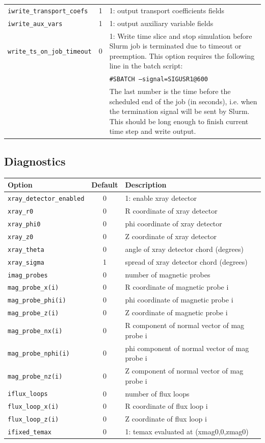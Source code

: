 \begin{tabular}{lcp{4in}}
 \texttt{iwrite\_transport\_coefs}  & 1 & 1: output transport coefficients fields \\
 \texttt{iwrite\_aux\_vars}         & 1 & 1: output auxiliary variable fields \\
 \texttt{write\_ts\_on\_job\_timeout}         & 0 & 1: Write time slice and stop simulation before Slurm job is terminated due to timeout or preemption. This option requires the following line in the batch script:\\
                         &   & \texttt{\#SBATCH --signal=SIGUSR1@600}\\
                         &   & The last number is the time before the scheduled end of the job (in seconds), i.e. when the termination signal will be sent by Slurm. This should be long enough to finish current time step and write output.\\

\end{tabular}


\subsection{Diagnostics}

\begin{tabular}{lcp{4in}}
  \textbf{Option}&\textbf{Default}&\textbf{Description}\\
  \hline
 \texttt{xray\_detector\_enabled} & 0 &  1:  enable xray detector \\
 \texttt{xray\_r0}     & 0 &  R coordinate of xray detector \\
 \texttt{xray\_phi0}   & 0 &  phi coordinate of xray detector \\
 \texttt{xray\_z0}     & 0 &  Z coordinate of xray detector \\
 \texttt{xray\_theta}  & 0 & angle of xray detector chord (degrees) \\
 \texttt{xray\_sigma} & 1 &  spread of xray detector chord (degrees) \\
 \texttt{imag\_probes}& 0 &  number of magnetic probes \\
 \texttt{mag\_probe\_x(i)} & 0 &    R coordinate of magnetic probe i \\
 \texttt{mag\_probe\_phi(i)} & 0 & phi coordinate of magnetic probe i \\
 \texttt{mag\_probe\_z(i)}   & 0 & Z coordinate of magnetic probe i \\
 \texttt{mag\_probe\_nx(i)}  & 0 & R component of normal vector of mag probe i \\
 \texttt{mag\_probe\_nphi(i)}& 0 & phi component of normal vector of mag probe i \\
 \texttt{mag\_probe\_nz(i)}  & 0 & Z component of normal vector of mag probe i \\
 \texttt{iflux\_loops}       & 0 & number of flux loops \\
 \texttt{flux\_loop\_x(i)}   & 0 & R coordinate of flux loop i \\
 \texttt{flux\_loop\_z(i)}   & 0 & Z coordinate of flux loop i \\
 \texttt{ifixed\_temax}      & 0 & 1: temax evaluated at (xmag0,0,zmag0)

\end{tabular}
